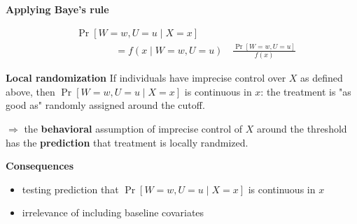 \begin{frame}\textbf{Applying Baye's rule}\vspace{0.3cm}

\begin{align*}
& \Pr[W = w, U = u \mid X = x] \\
&\qquad\qquad = f(x \mid W = w, U = u) \quad\frac{\Pr[W = w, U = u]}{f(x)}
\end{align*}
\end{frame}
\begin{frame}\vspace{0.3cm}

\textbf{Local randomization} If individuals have imprecise control over $X$ as defined above, then $\Pr[W =w, U = u \mid X = x]$ is continuous in $x$: the treatment is "as good as" randomly assigned around the cutoff.\vspace{0.3cm}

$\Rightarrow$ the \textbf{behavioral} assumption of imprecise control of $X$ around the threshold has the \textbf{prediction} that treatment is locally randmized.

\end{frame}
\begin{frame}\textbf{Consequences}\vspace{0.3cm}

\begin{itemize}\setlength\itemsep{1em}
\item testing prediction that $\Pr[W =w, U = u \mid X = x]$ is continuous in $x$
\item irrelevance of including baseline covariates
\end{itemize}


\end{frame}
